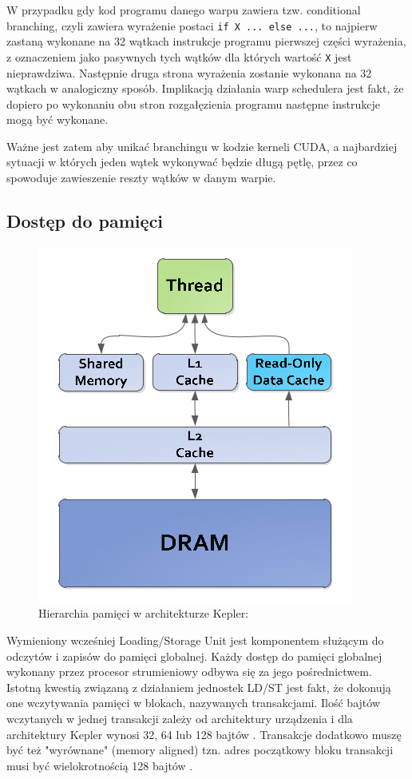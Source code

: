 W przypadku gdy kod programu danego warpu zawiera tzw. conditional branching,
  czyli zawiera wyrażenie postaci \texttt{if X {...} else {...}}, to najpierw
  zastaną wykonane na 32 wątkach instrukcje programu pierwszej części wyrażenia,
  z oznaczeniem jako pasywnych tych wątków dla których wartość \texttt{X} jest
  nieprawdziwa. Następnie druga strona wyrażenia zostanie wykonana na 32 wątkach
  w analogiczny sposób. Implikacją działania warp schedulera jest fakt, że
  dopiero po wykonaniu obu stron rozgałęzienia programu następne instrukcje mogą
  być wykonane. 
  
Ważne jest zatem aby unikać branchingu w kodzie kerneli CUDA, a
najbardziej sytuacji w których jeden wątek wykonywać będzie długą pętlę, przez
co spowoduje zawieszenie reszty wątków w danym warpie.

\subsection{Dostęp do pamięci}

\begin{figure}[ht]
\centering
\includegraphics[scale=0.4]{images/memory-hierarchy2.png}
\caption{Hierarchia pamięci w architekturze Kepler: \cite{kepler}}
\label{hierarchiaKepler}
\end{figure}

Wymieniony wcześniej Loading/Storage Unit jest komponentem służącym do odczytów
i zapisów do pamięci globalnej. Każdy dostęp do pamięci globalnej wykonany przez
procesor strumieniowy odbywa się za jego pośrednictwem. Istotną kwestią związaną
z działaniem jednostek LD/ST jest fakt, że dokonują one wczytywania pamięci w
blokach, nazywanych transakcjami. Ilość bajtów wczytanych w jednej transakcji
zależy od architektury urządzenia i dla architektury Kepler wynosi 32, 64 lub
128 bajtów \cite{Nvi11b}. Transakcje dodatkowo muszę być też "wyrównane" (memory
		aligned) tzn. adres początkowy bloku transakcji musi być wielokrotnością
128 bajtów \cite{Nvi11b}.

